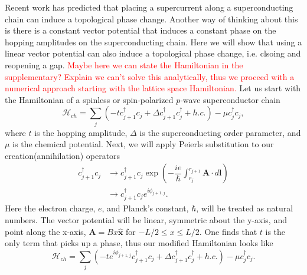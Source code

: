 \documentclass[aps,prb,showpacs,amsmath,amssymb,superscriptaddress]{revtex4-2}
\newcommand{\Red}[1]{\textcolor{red}{#1}}
\let\oldhat\hat
\renewcommand{\hat}[1]{\oldhat{\mathbf{#1}}}
\renewcommand{\vec}[1]{\mathbf{#1}}
\newcommand{\Ham}{\mathcal{H}}
\newcommand{\cc}{c^{\dagger}}
\newcommand{\de}{\Delta}
\begin{document}
Recent work has predicted that placing a supercurrent along a superconducting chain can induce a topological phase change.
Another way of thinking about this is there is a constant vector potential that induces a constant phase on the hopping amplitudes on the superconducting chain.
Here we will show that using a linear vector potential can also induce a topological phase change, i.e. clsoing and reopening a gap.
\Red{Maybe here we can state the Hamiltonian in the supplementary? Explain we can't solve this analytically, thus we proceed with a numerical approach starting with the lattice space Hamiltonian.}
Let us start with the Hamiltonian of a spinless or spin-polarized $p$-wave superconductor chain
\begin{equation}
  \Ham_{ch} = \sum_j (-t\cc_{j+1} c_j + \de \cc_{j+1}\cc_j + h.c.) - \mu \cc_j c_j,
\end{equation}
where $t$ is the hopping amplitude, $\de$ is the superconducting order parameter, and $\mu$ is the chemical potential.
Next, we will apply Peierls substitution to our creation(annihilation) operators
\begin{align}
  \cc_{j+1} c_j &\rightarrow \cc_{j+1} c_j \exp \left(-\dfrac{i e}{\hbar} \int_{r_j}^{r_{j+1}} \vec{A} \cdot d\vec{l} \right) \\ \nonumber
  &\rightarrow \cc_{j+1} c_j e^{i \phi_{j+1,j}}.
\end{align}
Here the electron charge, $e$, and Planck's constant, $\hbar$, will be treated as natural numbers. The vector potential will be linear, symmetric about the y-axis, and point along the x-axis, $\vec{A} = Bx\hat{x}$ for $-L/2 \leq x \leq L/2$.
One finds that $t$ is the only term that picks up a phase, thus our modified Hamiltonian looks like
\begin{equation} \label{eq: Peierls chain}
  \Ham_{ch} = \sum_j (-t e^{i\phi_{j+1,j}} \cc_{j+1} c_j + \de \cc_{j+1}\cc_j + h.c.) - \mu \cc_j c_j.
\end{equation}
\end{document}
